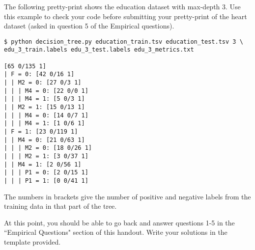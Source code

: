 \documentclass[11pt,addpoints,answers]{exam}
\begin{document}
The following pretty-print shows the education dataset with max-depth 3.  Use this example to check your code before submitting your pretty-print of the heart dataset (asked in question 5 of the Empirical questions).  

\begin{lstlisting}[language=Shell]
$ python decision_tree.py education_train.tsv education_test.tsv 3 \
edu_3_train.labels edu_3_test.labels edu_3_metrics.txt

[65 0/135 1]
| F = 0: [42 0/16 1]
| | M2 = 0: [27 0/3 1]
| | | M4 = 0: [22 0/0 1]
| | | M4 = 1: [5 0/3 1]
| | M2 = 1: [15 0/13 1]
| | | M4 = 0: [14 0/7 1]
| | | M4 = 1: [1 0/6 1]
| F = 1: [23 0/119 1]
| | M4 = 0: [21 0/63 1]
| | | M2 = 0: [18 0/26 1]
| | | M2 = 1: [3 0/37 1]
| | M4 = 1: [2 0/56 1]
| | | P1 = 0: [2 0/15 1]
| | | P1 = 1: [0 0/41 1]
\end{lstlisting}

The numbers in brackets give the number of positive and negative labels from the training data in that part of the tree.

\begin{notebox}
At this point, you should be able to go back and answer questions 1-5 in the ``Empirical Questions" section of this handout.  Write your solutions in the template provided. \end{notebox}
\end{document}
